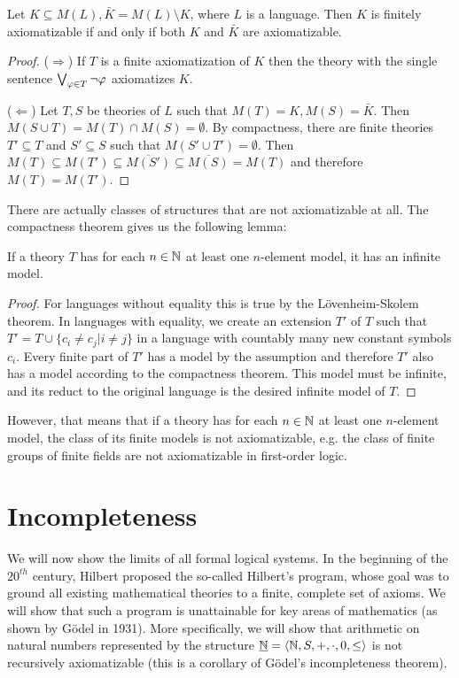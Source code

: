 \begin{theorem}
Let $K \subseteq M(L), \bar{K} = M(L) \setminus K$, where $L$ is a language. Then $K$ is finitely axiomatizable if and only if both $K$ and $\bar{K}$ are axiomatizable.
\end{theorem}
\begin{proof}
($\Rightarrow$) If $T$ is a finite axiomatization of $K$ then the theory with the single sentence $\bigvee_{\varphi \in T} \neg \varphi$ axiomatizes $K$.

($\Leftarrow$) Let $T, S$ be theories of $L$ such that $M(T) = K, M(S) = \bar{K}$. Then $M(S \cup T) = M(T) \cap M(S) = \emptyset$. By compactness, there are finite theories $T' \subseteq T$ and $S' \subseteq S$ such that $M(S' \cup T') = \emptyset$. Then $M(T) \subseteq M(T') \subseteq \overline{M(S')} \subseteq \overline{M(S)}=M(T)$ and therefore $M(T) = M(T')$.
\end{proof}



There are actually classes of structures that are not axiomatizable at all. The compactness theorem gives us the following lemma:

\begin{lemma}
If a theory $T$ has for each $n \in \mathbb{N}$ at least one $n$-element model, it has an infinite model.
\end{lemma}
\begin{proof}
For languages without equality this is true by the Lövenheim-Skolem theorem. In languages with equality, we create an extension $T'$ of $T$ such that $T' = T \cup \{c_i \neq c_j| i \neq j\}$ in a language with countably many new constant symbols $c_i$. Every finite part of $T'$ has a model by the assumption and therefore $T'$ also has a model according to the compactness theorem. This model must be infinite, and its reduct to the original language is the desired infinite model of $T$.
\end{proof}

However, that means that if a theory has for each $n \in \mathbb{N}$ at least one $n$-element model, the class of its finite models is not axiomatizable, e.g. the class of finite groups of finite fields are not axiomatizable in first-order logic.

\section{Incompleteness}

We will now show the limits of all formal logical systems. In the beginning of the $20^{th}$ century, Hilbert proposed the so-called Hilbert's program, whose goal was to ground all existing mathematical theories to a finite, complete set of axioms. We will show that such a program is unattainable for key areas of mathematics (as shown by Gödel in 1931). More specifically, we will show that arithmetic on natural numbers represented by the structure $\underline{\mathbb{N}} = \langle \mathbb{N}, S, +, \cdot, 0, \leq \rangle$ is not recursively axiomatizable (this is a corollary of Gödel's incompleteness theorem).

